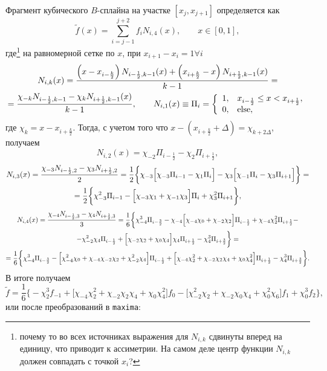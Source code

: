 Фрагмент кубического $B$-сплайна на участке $[x_j,x_{j+1}]$ определяется как
$$
\widetilde f(x) = \sum_{i=j-1}^{j+2} f_i N_{i,4}(x),\qquad x\in[0,1],
$$
где\footnote{почему то во всех источниках выражения для $N_{i,k}$ сдвинуты вперед на единицу, что приводит к ассиметрии. На самом деле центр функции $N_{i,k}$
  должен совпадать с точкой $x_i$?} на равномерной сетке по $x$, при $x_{i+1}-x_i=1\forall i$
\begin{multline}
  N_{i,k}(x) = \frac{\left(x-x_{i-\frac k2}\right)N_{i-\frac12,k-1}(x) + \left(x_{i+\frac k2}-x\right)N_{i+\frac12,k-1}(x)}{k-1}
  =\\=
\frac{\chi_{-k}N_{i-\frac12,k-1} - \chi_{k}N_{i+\frac12,k-1}(x)}{k-1},
\qquad N_{i,1}(x) \equiv \Pi_i = \left\{\begin{array}{ll} 1,& x_{i-\frac12}\le x<x_{i+\frac12},\\ 0, & \rm else, \end{array}\right.
\notag
\end{multline}
где $\chi_k=x-x_{i+\frac k2}$. Тогда, с учетом того что $x-\left(x_{i+\frac k2}+\Delta\right) = \chi_{k+2\Delta}$, получаем 
$$
N_{i,2}(x) = \chi_{-2}\Pi_{i-\frac12} - \chi_2\Pi_{i+\frac12},
$$
\begin{multline}
  N_{i,3}(x) = \frac{\chi_{-3} N_{i-\frac12,2} -\chi_3 N_{i+\frac12,2}}2
  =\frac12\bigg\{\chi_{-3}\Big[\chi_{-3}\Pi_{i-1} -\chi_1\Pi_{i}\Big] -\chi_3\Big[\chi_{-1}\Pi_{i} -\chi_3\Pi_{i+1}\Big]\bigg\}
  =\\=\frac12\bigg\{\chi_{-3}^2 \Pi_{i-1} - \Big[\chi_{-3}\chi_1 + \chi_{-1}\chi_3\Big]\Pi_{i} +\chi_3^2\Pi_{i+1}\bigg\},
  \notag
\end{multline}
\begin{multline}
  N_{i,4}(x) = \frac{\chi_{-4} N_{i-\frac12,3} -\chi_4 N_{i+\frac12,3}}3 =
  \frac16\bigg\{\chi_{-4}^3 \Pi_{i-\frac32} - \chi_{-4}\Big[\chi_{-4}\chi_0 + \chi_{-2}\chi_2\Big]\Pi_{i-\frac12} +\chi_{-4}\chi_2^2\Pi_{i+\frac12}
  -\\-\chi_{-2}^2\chi_4 \Pi_{i-\frac12} + \Big[\chi_{-2}\chi_2 + \chi_{0}\chi_4\Big]\chi_4\Pi_{i+\frac12} -\chi_4^3\Pi_{i+\frac32}
  \bigg\}=\\=
\frac16\bigg\{\chi_{-4}^3 \Pi_{i-\frac32} - \Big[ \chi_{-4}^2\chi_{0} + \chi_{-4}\chi_{-2}\chi_2 + \chi_{-2}^2\chi_4\Big]\Pi_{i-\frac12} 
  +\Big[ \chi_{-4}\chi_2^2 + \chi_{-2}\chi_2\chi_4 + \chi_0\chi_4^2 \Big]\Pi_{i+\frac12} -\chi_4^3\Pi_{i+\frac32}
  \bigg\}
  .\notag
\end{multline}
В итоге получаем
$$
\widetilde f = \frac16\bigg\{ - \chi_2^3 f_{-1} +\Big[ \chi_{-4}\chi_2^2 + \chi_{-2}\chi_2\chi_4 + \chi_0\chi_4^2 \Big]f_0
-\Big[ \chi_{-2}^2\chi_{2} + \chi_{-2}\chi_{0}\chi_4 + \chi_{0}^2\chi_6 \Big] f_1 +\chi_0^3 f_2 \bigg\},
$$
или после преобразований в \verb'maxima':

